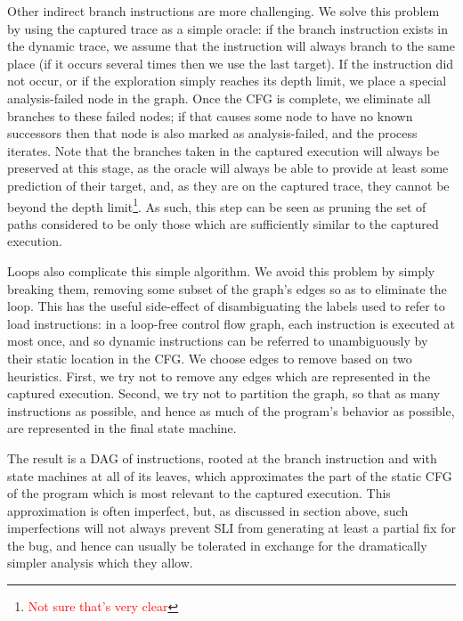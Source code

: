\documentclass[10pt,twocolumn,preprint,natbib,authoryear]{sigplanconf}
\newcommand{\editorial}[1]{\textcolor{red}{\footnote{\textcolor{red}{#1}}}}
\begin{document}
Other indirect branch instructions are more challenging.  We solve
this problem by using the captured trace as a simple oracle: if the
branch instruction exists in the dynamic trace, we assume that the
instruction will always branch to the same place (if it occurs several
times then we use the last target).  If the instruction did not occur,
or if the exploration simply reaches its depth limit, we place a
special analysis-failed node in the graph.  Once the CFG is complete,
we eliminate all branches to these failed nodes; if that causes some
node to have no known successors then that node is also marked as
analysis-failed, and the process iterates.  Note that the branches
taken in the captured execution will always be preserved at this
stage, as the oracle will always be able to provide at least some
prediction of their target, and, as they are on the captured trace,
they cannot be beyond the depth limit\editorial{Not sure that's very
  clear}.  As such, this step can be seen as pruning the set of paths
considered to be only those which are sufficiently similar to the
captured execution.

Loops also complicate this simple algorithm.  We avoid this problem by
simply breaking them, removing some subset of the graph's edges so as
to eliminate the loop.  This has the useful side-effect of
disambiguating the labels used to refer to load instructions: in a
loop-free control flow graph, each instruction is executed at most
once, and so dynamic instructions can be referred to unambiguously by
their static location in the CFG.  We choose edges to remove based on
two heuristics.  First, we try not to remove any edges which are
represented in the captured execution.  Second, we try not to
partition the graph, so that as many instructions as possible, and
hence as much of the program's behavior as possible, are represented
in the final state machine.

The result is a DAG of instructions, rooted at the branch instruction
and with state machines at all of its leaves, which approximates the
part of the static CFG of the program which is most relevant to the
captured execution.  This approximation is often imperfect, but, as
discussed in section above, such imperfections will not always prevent
SLI from generating at least a partial fix for the bug, and hence can
usually be tolerated in exchange for the dramatically simpler analysis
which they allow.
\end{document}
